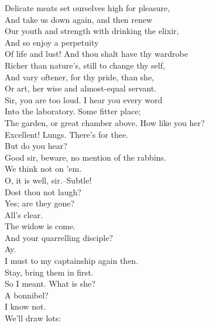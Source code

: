 \documentclass{memoir}
\begin{document}
\begin{drama*}
 Delicate meats set ourselves high for pleasure,\\
 And take us down again, and then renew\\
 Our youth and strength with drinking the elixir,\\
 And so enjoy a perpetuity\\
 Of life and lust! And thou shalt have thy wardrobe\\
 Richer than nature's, still to change thy self,\\
 And vary oftener, for thy pride, than she,\\
 Or art, her wise and almost-equal servant.\\
\facespeaks  Sir, you are too loud. I hear you every word\\
 Into the laboratory. Some fitter place;\\
 The garden, or great chamber above. How like you her?\\
\mammonspeaks  Excellent! Lungs. There's for thee.\\
\facespeaks {} But do you hear?\\
 Good sir, beware, no mention of the rabbins.\\
\mammonspeaks  We think not on 'em.\\
\facespeaks {} O, it is well, sir.--Subtle!\\
 Dost thou not laugh?\\
\subtlespeaks {} Yes; are they gone?\\
\facespeaks {} All's clear.\\
\subtlespeaks  The widow is come.\\
\facespeaks {} And your quarrelling disciple?\\
\subtlespeaks  Ay.\\
\facespeaks {} I must to my captainship again then.\\
\subtlespeaks  Stay, bring them in first.\\
\facespeaks {} So I meant. What is she?\\
 A bonnibel?\\
\subtlespeaks {} I know not.\\
\facespeaks {} We'll draw lots:\\

\end{drama*}
\end{document}
